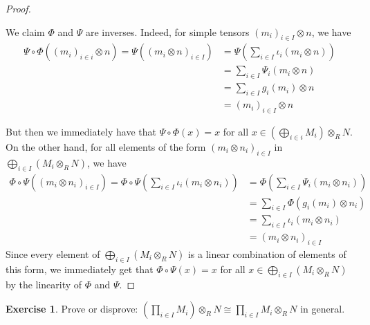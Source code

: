 \documentclass[11pt]{book}
\newcounter{counter}
\theoremstyle{definition}   \newtheorem{defn}[counter]{Definition} %
\newtheorem{exercise}[counter]{Exercise}
\newcommand{\vs}{\vspace{8pt}}
\numberwithin{counter}{chapter}
\begin{document}
\begin{proof}
\begin{enumerate}
\end{enumerate}

\vs

We claim $\Phi$ and $\Psi$ are inverses. Indeed, for simple tensors $(m_i)_{i \in I} \otimes n$, we have
\begin{align*}
\Psi \circ \Phi ((m_i)_{i \in i} \otimes n) = \Psi ((m_i \otimes n)_{i \in I}) &= \Psi \left( \sum_{i \in I} \iota_i (m_i \otimes n)\right) \tag{finite sum} \\
&= \sum_{i \in I} \Psi_i(m_i \otimes n) \\
&= \sum_{i \in I} g_i(m_i) \otimes n \\
&= (m_i)_{i \in I} \otimes n
\end{align*}

But then we immediately have that $\Psi \circ \Phi(x) = x$ for all $x \in \left(\bigoplus_{i \in i} M_i\right) \otimes_R N$. On the other hand, for all elements of the form $(m_i \otimes n_i)_{i \in I} $ in $ \bigoplus_{i \in I} (M_i \otimes_R N)$, we have
\begin{align*}
\Phi \circ \Psi ((m_i \otimes n_i)_{i \in I}) = \Phi \circ \Psi \left(\sum_{i \in I} \iota_i (m_i \otimes n_i) \right) &= \Phi \left(\sum_{i \in I} \Psi_i(m_i \otimes n_i) \right) \\
&= \sum_{i \in I} \Phi (g_i(m_i) \otimes n_i) \\
&= \sum_{i \in I} \iota_i(m_i \otimes n_i) \\
&= (m_i \otimes n_i)_{i \in I} 
\end{align*}
Since every element of $\bigoplus_{i \in I} (M_i \otimes_R N)$ is a linear combination of elements of this form, we immediately get that $\Phi \circ \Psi (x) = x$ for all $x \in \bigoplus_{i \in I} (M_i \otimes_R N)$ by the linearity of $\Phi$ and $\Psi$. 
\end{proof}

\vs

\begin{exercise}
Prove or disprove: $\left(\prod_{i \in I} M_i\right) \otimes_R N \cong \prod_{i \in I} M_i \otimes_R N$ in general. 
\end{exercise}
\end{document}
